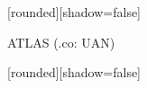 \documentclass[%
xcolor=pdftex,dvipsnames,table%
]{beamer}
\begin{document}
{
[rounded][shadow=false]
\begin{frame}[plain]
  \begin{block}{}
    ATLAS (.co: UAN)
  \end{block}
\end{frame}
}
{
[rounded][shadow=false]
\begin{frame}[plain]
\end{frame}
}
\end{document}
